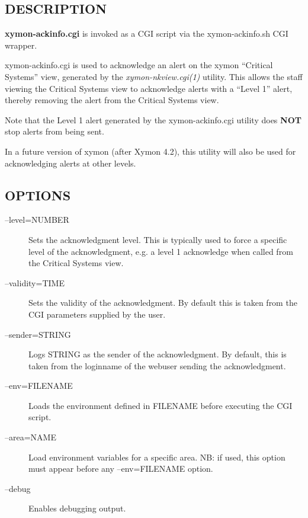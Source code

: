  
\subsection{DESCRIPTION}
\textbf{xymon-ackinfo.cgi}
 is invoked as a CGI script via the xymon-ackinfo.sh CGI wrapper. 

  xymon-ackinfo.cgi is used to acknowledge an alert on the xymon
  ``Critical Systems'' view, generated by the
  \emph{xymon-nkview.cgi(1)} utility. This allows the staff viewing
  the Critical Systems view to acknowledge alerts with a ``Level 1''
  alert, thereby removing the alert from the Critical Systems view. 



  Note that the Level 1 alert generated by the xymon-ackinfo.cgi
  utility does \textbf{NOT} stop alerts from being sent. 



  In a future version of xymon (after Xymon 4.2), this utility will
  also be used for acknowledging alerts at other levels. 



 
\subsection{OPTIONS}
\begin{description}
\item[--level=NUMBER] Sets the acknowledgment level. This is typically
  used to force a specific level of the acknowledgment, e.g. a level 1
  acknowledge when called from the Critical Systems view. 


 

\item[--validity=TIME] Sets the validity of the acknowledgment. By
  default this is taken from the CGI parameters supplied by the user. 


 

\item[--sender=STRING] Logs STRING as the sender of the
  acknowledgment. By default, this is taken from the loginname of the
  webuser sending the acknowledgment. 


 

\item[--env=FILENAME] Loads the environment defined in FILENAME before executing the CGI script. 

 

\item[--area=NAME] Load environment variables for a specific area. NB:
  if used, this option must appear before any --env=FILENAME option. 


 

\item[--debug] Enables debugging output. 


\end{description}
